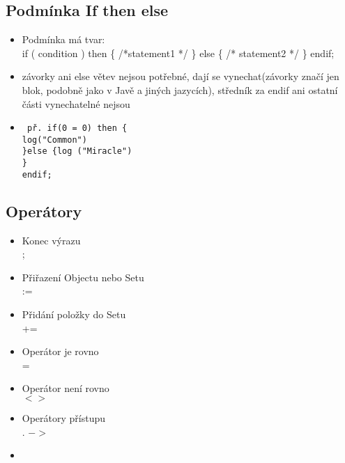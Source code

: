 \documentclass[11pt,a4paper]{article}   	%
\begin{document}
\subsection{Podmínka If then else}
\begin{itemize}
   \item 	Podmínka má tvar: \\
   		 	if ( condition ) then \{ /*statement1 */ \} else \{ /* statement2 */ \}
   		 	endif;
   \item 	závorky ani else větev nejsou potřebné, dají se vynechat(závorky značí
   			jen blok, podobně jako v Javě a jiných jazycích), středník za endif ani
   			ostatní části vynechatelné nejsou
   
   \item 	\texttt {
   				př. if(0 = 0) then \{ \\ log("Common") \\ 
   				\}else \{log ("Miracle") \\ \}
   				\\endif; 
   			}
\end{itemize} 

\subsection{Operátory}
\begin{itemize}
  	\item	Konec výrazu \\
			;
	\item	Přiřazení Objectu nebo Setu \\
			:=
	\item	Přidání položky do Setu \\
			+=
  	\item 	Operátor je rovno \\
			=
	\item 	Operátor není rovno \\
			$<>$
	\item  Operátory přístupu \\
			. $->$
	\item 
\end{itemize}
\end{document}
